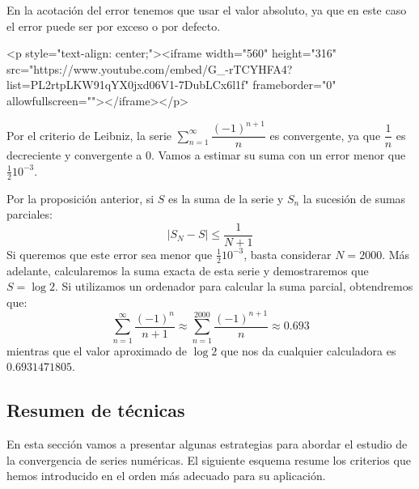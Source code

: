 En la acotación del error tenemos que usar el valor absoluto, ya que en este caso el error puede ser por exceso o por defecto.

\begin{rawhtml}
<p style="text-align: center;"><iframe width="560" height="316" src="https://www.youtube.com/embed/G_-rTCYHFA4?list=PL2rtpLKW91qYX0jxd06V1-7DubLCx6l1f" frameborder="0" allowfullscreen=""></iframe></p>
\end{rawhtml}

\begin{ejemplo}
Por el criterio de Leibniz, la serie $\displaystyle\sum_{n=1}^\infty  \dfrac{(-1)^{n+1}}{n}$ es convergente, ya que $\dfrac1n$ es decreciente y convergente a 0.
Vamos a estimar su suma con un error menor que $\frac1210^{-3}$.

Por la proposición anterior, si $S$ es la suma de la serie y $S_n$ la sucesión de sumas parciales:
\[
|S_N-S| \le \frac1{N+1}
\]
Si queremos que este error sea menor que $\frac1210^{-3}$, basta considerar $N=2000$.
Más adelante, calcularemos la suma exacta de esta serie y demostraremos que $S=\log 2$.
Si utilizamos un ordenador para calcular la suma parcial, obtendremos que:
\[
\displaystyle\sum_{n=1}^\infty  \dfrac{(-1)^n}{n+1}\approx\sum_{n=1}^{2000}\frac{(-1)^{n+1}}n \approx 0.693
\]
mientras que el valor aproximado de $\log 2$ que nos da cualquier calculadora  es $0.6931471805$.
\fej\end{ejemplo}

\subsection{Resumen de técnicas}

En esta sección vamos a presentar algunas estrategias para abordar el estudio de la convergencia de series numéricas.
%
%
El siguiente esquema resume los criterios que hemos introducido en el orden 
más adecuado para su aplicación.

